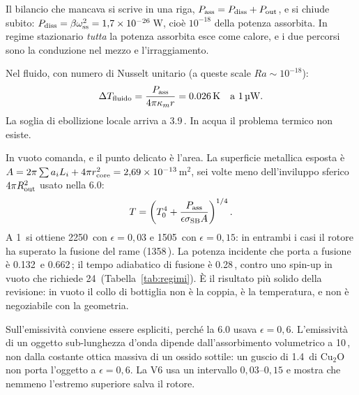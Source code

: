 \documentclass[11pt,a4paper]{article}
\providecommand{\micro}{\textmu}
\providecommand{\SI}[2]{#1\,\text{#2}}
\begin{document}
Il bilancio che mancava si scrive in una riga,
$P_{\rm ass}=P_{\rm diss}+P_{\rm out}$, e si chiude subito:
$P_{\rm diss}=\beta\omega_{\rm ss}^2=1{,}7\times10^{-26}$\,W, cio\`e $10^{-18}$ della
potenza assorbita. In regime stazionario \emph{tutta} la potenza assorbita esce come
calore, e i due percorsi sono la conduzione nel mezzo e l'irraggiamento.

Nel fluido, con numero di Nusselt unitario (a queste scale $Ra\sim10^{-18}$):
\begin{equation}
\Delta T_{\rm fluido}=\frac{P_{\rm ass}}{4\pi\kappa_m r}=\SI{0.026}{K}
\quad\text{a \SI{1}{\micro W}.}
\end{equation}
La soglia di ebollizione locale arriva a \SI{3.9}{mW}. In acqua il problema termico
non esiste.

In vuoto comanda, e il punto delicato \`e l'area. La superficie metallica esposta
\`e $A=2\pi\sum a_iL_i+4\pi r_{\rm core}^2=2{,}69\times10^{-13}$\,m$^2$, sei volte
meno dell'inviluppo sferico $4\pi R_{\rm out}^2$ usato nella 6.0:
\begin{equation}
T=\left(T_0^4+\frac{P_{\rm ass}}{\epsilon\sigma_{\rm SB}A}\right)^{1/4}.
\end{equation}
A \SI{1}{\micro W} si ottiene \SI{2250}{K} con $\epsilon=0{,}03$ e \SI{1505}{K} con
$\epsilon=0{,}15$: in entrambi i casi il rotore ha superato la fusione del rame
(\SI{1358}{K}). La potenza incidente che porta a fusione \`e
\SI{0.132}{\micro W} e \SI{0.662}{\micro W}; il tempo adiabatico di fusione \`e
\SI{0.28}{ms}, contro uno spin-up in vuoto che richiede \SI{24}{s}
(Tabella~\ref{tab:regimi}). \`E il risultato pi\`u solido della revisione: in vuoto il
collo di bottiglia non \`e la coppia, \`e la temperatura, e non \`e negoziabile con la
geometria.

Sull'emissivit\`a conviene essere espliciti, perch\'e la 6.0 usava $\epsilon=0{,}6$.
L'emissivit\`a di un oggetto sub-lunghezza d'onda dipende dall'assorbimento
volumetrico a \SI{10}{\micro m}, non dalla costante ottica massiva di un ossido
sottile: un guscio di \SI{1.4}{nm} di Cu$_2$O non porta l'oggetto a
$\epsilon=0{,}6$. La V6 usa un intervallo $0{,}03$--$0{,}15$ e mostra che nemmeno
l'estremo superiore salva il rotore.
\end{document}
